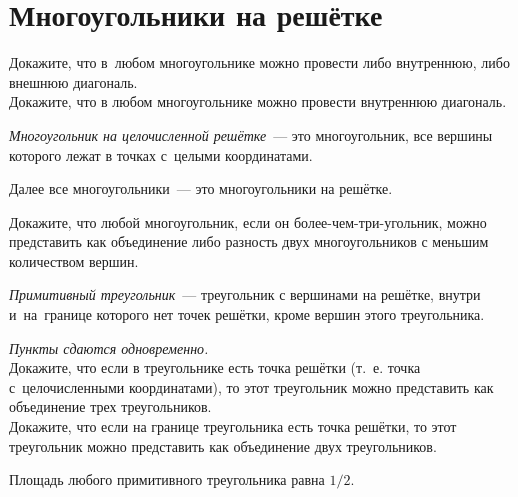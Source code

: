 
\section*{Многоугольники на решётке}



\begin{problems}

\item
\sp
Докажите, что в~любом многоугольнике можно провести либо внутреннюю,
либо внешнюю диагональ.
\\
\spx{*}
Докажите, что в любом многоугольнике можно провести внутреннюю диагональ.

\end{problems}

\emph{Многоугольник на целочисленной решётке}~--- это многоугольник, все
вершины которого лежат в точках с~целыми координатами.

Далее все многоугольники~--- это многоугольники на решётке.

\begin{problems}

\item
Докажите, что любой многоугольник, если он более-чем-три-угольник, можно
представить как объединение либо разность двух многоугольников
с меньшим количеством вершин.

\end{problems}

\emph{Примитивный треугольник}~--- треугольник с вершинами на решётке, внутри
и~на~границе которого нет точек решётки, кроме вершин этого треугольника.

\begin{problems}

\item
\emph{Пункты сдаются одновременно.}
\\
\sp
Докажите, что если в треугольнике есть точка решётки
(т.~е. точка с~целочисленными координатами),
то этот треугольник можно представить как объединение трех треугольников.
\\
\sp
Докажите, что если на границе треугольника есть точка решётки,
то этот треугольник можно представить как объединение двух треугольников.

\itemx{$^\circ$}
Площадь любого примитивного треугольника равна $1/2$.

\end{problems}

